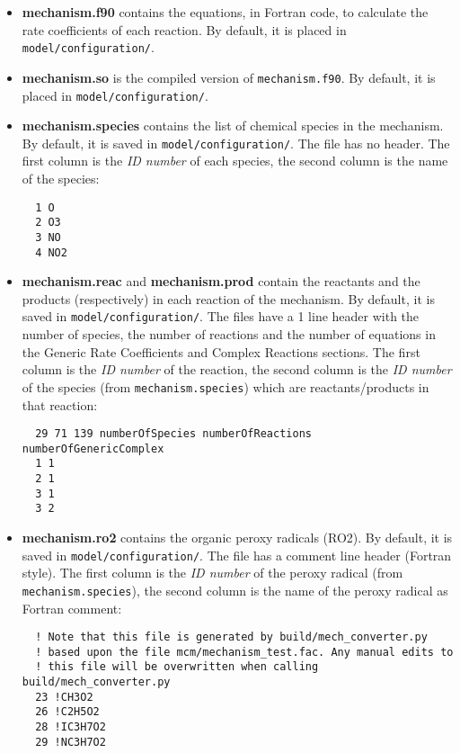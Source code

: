 \begin{itemize}
\item \textbf{mechanism.f90} contains the equations, in Fortran code,
  to calculate the rate coefficients of each reaction. By default, it
  is placed in \texttt{model/configuration/}.
\item \textbf{mechanism.so} is the compiled version of
  \texttt{mechanism.f90}. By default, it is placed in
  \texttt{model/configuration/}.
\item \textbf{mechanism.species} contains the list of chemical species
  in the mechanism. By default, it is saved in
  \texttt{model/configuration/}. The file has no header. The first
  column is the \emph{ID number} of each species, the second column is
  the name of the species:
  \begin{verbatim}
  1 O
  2 O3
  3 NO
  4 NO2
\end{verbatim}
\item \textbf{mechanism.reac} and \textbf{mechanism.prod} contain the
  reactants and the products (respectively) in each reaction of the
  mechanism. By default, it is saved in \texttt{model/configuration/}.
  The files have a 1 line header with the number of species, the
  number of reactions and the number of equations in the Generic Rate
  Coefficients and Complex Reactions sections. The first column is the
  \emph{ID number} of the reaction, the second column is the \emph{ID
    number} of the species (from \texttt{mechanism.species}) which are
  reactants/products in that reaction:
  \begin{verbatim}
  29 71 139 numberOfSpecies numberOfReactions numberOfGenericComplex
  1 1
  2 1
  3 1
  3 2
\end{verbatim}
\item \textbf{mechanism.ro2} contains the organic peroxy radicals
  (RO2). By default, it is saved in \texttt{model/configuration/}. The
  file has a comment line header (Fortran style). The first column is
  the \emph{ID number} of the peroxy radical (from
  \texttt{mechanism.species}), the second column is the name of the
  peroxy radical as Fortran comment:
  \begin{verbatim}
  ! Note that this file is generated by build/mech_converter.py
  ! based upon the file mcm/mechanism_test.fac. Any manual edits to
  ! this file will be overwritten when calling build/mech_converter.py
  23 !CH3O2
  26 !C2H5O2
  28 !IC3H7O2
  29 !NC3H7O2
\end{verbatim}
\end{itemize}

